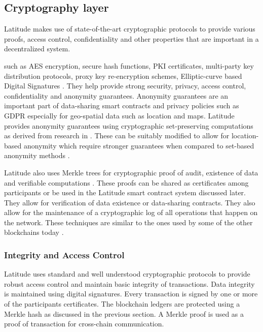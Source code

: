 \subsection{Cryptography layer} \label{sec:crypto} Latitude makes use of state-of-the-art cryptographic protocols to
provide various proofs, access control, confidentiality and other properties that are important in a decentralized
system.

such as AES encryption, secure hash functions, PKI certificates, multi-party key distribution protocols, proxy key
re-encryption schemes, Elliptic-curve based Digital Signatures \cite{ecdsa}. They help provide strong security, privacy,
access control, confidentiality and anonymity guarantees. Anonymity guarantees are an important part of data-sharing
smart contracts and privacy policies such as GDPR \cite{gdpr} especially for geo-spatial data such as location and maps.
Latitude provides anonymity guarantees using cryptographic set-preserving computations as derived from research in
\cite{kissner_set}. These can be suitably modified to allow for location-based anonymity which require stronger
guarantees when compared to set-based anonymity methods \cite{divanis_kanon,xu_loc_anon}.

Latitude also uses Merkle trees for cryptographic proof of audit, existence of data and verifiable computations
\cite{becker2008}. These proofs can be shared as certificates among participants or be used in the Latitude smart
contract system discussed later. They allow for verification of data existence or data-sharing contracts. They also
allow for the maintenance of a cryptographic log of all operations that happen on the network. These techniques are
similar to the ones used by some of the other blockchains today \cite{buterin_merkle}.

\subsubsection{Integrity and Access Control}

Latitude uses standard and well understood cryptographic protocols to provide robust access control and maintain basic
integrity of transactions. Data integrity is maintained using digital signatures. Every transaction is signed by one or more of the participants
certificates. The blockchain ledgers are protected using a Merkle hash \cite{becker2008} as discussed in the previous
section. A Merkle proof is used as a proof of transaction for cross-chain communication.

